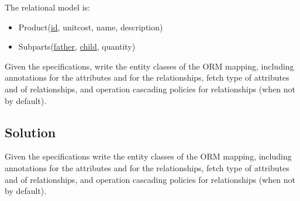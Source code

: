 \documentclass[12pt, a4paper]{report}
\begin{document}
        The relational model is: 
        \begin{itemize}
            \item Product(\underline{id}, unitcost, name, description)
            \item Subparts(\underline{father}, \underline{child}, quantity)
        \end{itemize}
        Given the specifications, write the entity classes of the ORM mapping, including annotations for the attributes and for the relationships, fetch type of 
        attributes and of relationships, and operation cascading policies for relationships (when not by default).
    \subsection*{Solution}
        Given the specifications write the entity classes of the ORM mapping, including annotations for the attributes and for the relationships, fetch type of attributes
        and of relationships, and operation cascading policies for relationships (when not by default). 
\end{document}
